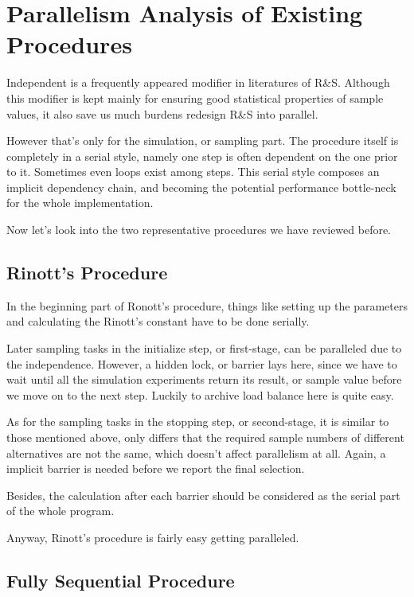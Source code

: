 \documentclass[12pt,a4]{report}
\begin{document}
\section{Parallelism Analysis of Existing Procedures}

Independent is a frequently appeared modifier in literatures of R\&S. Although this modifier is kept mainly for ensuring good statistical properties of sample values, it also save us much burdens redesign R\&S into parallel.

However that's only for the simulation, or sampling part. The procedure itself is completely in a serial style, namely one step is often dependent on the one prior to it. Sometimes even loops exist among steps. This serial style composes an implicit dependency chain, and becoming the potential performance bottle-neck for the whole implementation.

Now let's look into the two representative procedures we have reviewed before.

\subsection{Rinott's Procedure}

In the beginning part of Ronott's procedure, things like setting up the parameters and calculating the Rinott's constant have to be done serially.

Later sampling tasks in the initialize step, or first-stage, can be paralleled due to the independence. However, a hidden lock, or barrier lays here, since we have to wait until all the simulation experiments return its result, or sample value before we move on to the next step. Luckily to archive load balance here is quite easy.

As for the sampling tasks in the stopping step, or second-stage, it is similar to those mentioned above, only differs that the required sample numbers of different alternatives are not the same, which doesn't affect parallelism at all. Again, a implicit barrier is needed before we report the final selection.

Besides, the calculation after each barrier should be considered as the serial part of the whole program.

Anyway, Rinott's procedure is fairly easy getting paralleled.

\subsection{Fully Sequential Procedure}
\end{document}
